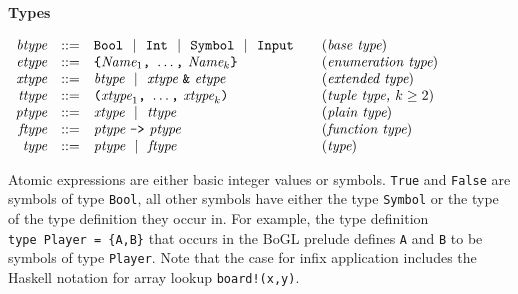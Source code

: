 \documentclass[11pt]{article}
\makeatletter
\newcommand{\prodName}[1]{&(\emph{#1})\\}
\newcommand{\nt}[1]{\textit{#1}}
\newcommand{\prog}[1]{\texttt{#1}}
\newcommand{\ORil}{\ \ |\ \ }
\newcommand{\IS}{&::=&}
\newcommand{\OR}{&|&}
\newcommand{\syntax}[2]{
  \needspace{3\baselineskip}
  \bigskip\par\noindent\textbf{#1}\par\smallskip%
  $\begin{array}{rcl@{\qquad}l}#2\end{array}$%
  \par\bigskip\noindent\ignorespaces
}
\newcommand{\lp}{\prog{(}}
\newcommand{\rp}{\prog{)}}
\newcommand{\paren}[1]{\lp#1\rp}
\makeatother
\begin{document}
\syntax{Types}{
\nt{btype}    \IS  \prog{Bool} \ORil \prog{Int} \ORil
                   \prog{Symbol} \ORil \prog{Input}
                                                         \prodName{base type}
\nt{etype}    \IS  \prog{\{}\nt{Name}_1\prog{,}\ \ldots\prog{,}\ \nt{Name}_k \prog{\}}               \prodName{enumeration type}
\nt{xtype}    \IS  \nt{btype} \ORil \nt{xtype}\ \prog{\&}\ \nt{etype}
                                                       \prodName{extended type}
\nt{ttype}    \IS  \paren{\nt{xtype}_1\prog{,}\ \ldots\prog{,}\ \nt{xtype}_k}
                                               \prodName{tuple type, $k\geq 2$}
\nt{ptype}     \IS  \nt{xtype} \ORil \nt{ttype}
                                                          \prodName{plain type}
\nt{ftype}    \IS  \nt{ptype}\ \prog{->}\ \nt{ptype}   \prodName{function type}
\nt{type}     \IS  \nt{ptype} \ORil \nt{ftype}                  \prodName{type}
}
%
Atomic expressions are either basic integer values or symbols. \prog{True} and
\prog{False} are symbols of type \prog{Bool}, all other symbols have either the
type \prog{Symbol} or the type of the type definition they occur in. For
example, the type definition \prog{type~Player~=~\{A,B\}} that occurs in the
BoGL prelude defines \prog{A} and \prog{B} to be symbols of type \prog{Player}.
%
Note that the case for infix application includes the Haskell notation for
array lookup \prog{board!(x,y)}.
\end{document}
